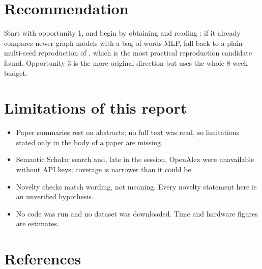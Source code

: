 \documentclass[11pt,a4paper]{article}
\begin{document}
\section{Recommendation}

Start with opportunity 1, and begin by obtaining and reading \cite{abdalla2023}: if it already compares newer graph models with a bag-of-words MLP, fall back to a plain multi-seed reproduction of \cite{galke2022}, which is the most practical reproduction candidate found. Opportunity 3 is the more original direction but uses the whole 8-week budget.

\section{Limitations of this report}

\begin{itemize}
\item Paper summaries rest on abstracts; no full text was read, so limitations stated only in the body of a paper are missing.
\item Semantic Scholar search and, late in the session, OpenAlex were unavailable without API keys; coverage is narrower than it could be.
\item Novelty checks match wording, not meaning. Every novelty statement here is an unverified hypothesis.
\item No code was run and no dataset was downloaded. Time and hardware figures are estimates.
\end{itemize}

\section{References}



\end{document}
